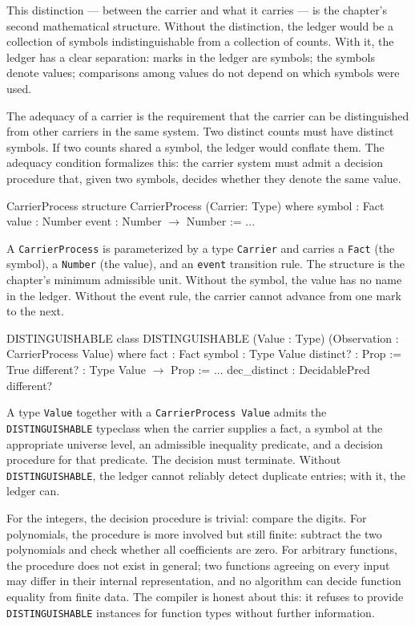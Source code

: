 This distinction --- between the carrier and what it carries --- is the
chapter's second mathematical structure. Without the distinction, the
ledger would be a collection of symbols indistinguishable from a
collection of counts. With it, the ledger has a clear separation: marks
in the ledger are symbols; the symbols denote values; comparisons among
values do not depend on which symbols were used.

The adequacy of a carrier is the requirement that the carrier can be
distinguished from other carriers in the same system. Two distinct
counts must have distinct symbols. If two counts shared a symbol, the
ledger would conflate them. The adequacy condition formalizes this:
the carrier system must admit a decision procedure that, given two
symbols, decides whether they denote the same value.

\begin{leanexcerpt}{CarrierProcess}
structure CarrierProcess (Carrier: Type) where
  symbol : Fact
  value  : Number
  event  : Number $\to$ Number := ...
\end{leanexcerpt}

A \texttt{CarrierProcess} is parameterized by a type \texttt{Carrier} and
carries a \texttt{Fact} (the symbol), a \texttt{Number} (the value), and
an \texttt{event} transition rule. The structure is the chapter's minimum
admissible unit. Without the symbol, the value has no name in the ledger.
Without the event rule, the carrier cannot advance from one mark to the
next.

\begin{leanexcerpt}{DISTINGUISHABLE}
class DISTINGUISHABLE
    (Value : Type)
    (Observation : CarrierProcess Value) where
  fact : Fact
  symbol : Type Value
  distinct? : Prop := True
  different? : Type Value $\to$ Prop := ...
  dec_distinct : DecidablePred different?
\end{leanexcerpt}

A type \texttt{Value} together with a \texttt{CarrierProcess Value}
admits the \texttt{DISTINGUISHABLE} typeclass when the carrier supplies
a fact, a symbol at the appropriate universe level, an admissible
inequality predicate, and a decision procedure for that predicate. The
decision must terminate. Without \texttt{DISTINGUISHABLE}, the ledger
cannot reliably detect duplicate entries; with it, the ledger can.

For the integers, the decision procedure is trivial: compare the digits.
For polynomials, the procedure is more involved but still finite: subtract
the two polynomials and check whether all coefficients are zero. For
arbitrary functions, the procedure does not exist in general; two
functions agreeing on every input may differ in their internal
representation, and no algorithm can decide function equality from finite
data. The compiler is honest about this: it refuses to provide
\texttt{DISTINGUISHABLE} instances for function types without further
information.

